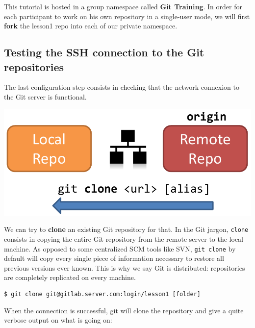 \documentclass{../common/tufte-latex/tufte-handout}
\begin{document}
This tutorial is hosted in a group namespace called \textbf{Git Training}.
In order for each participant to work on his own repository in a single-user mode, we will first \textbf{fork} the lesson1 repo into each of our private namespace.

\subsection{Testing the SSH connection to the Git repositories}

The last configuration step consists in checking  that the network connexion to the Git server is functional.
\begin{marginfigure}%
  \centering
  \includegraphics[width=\linewidth]{gitclone-schema.pdf}
  \label{fig:gitclone}
\end{marginfigure}
We can try to \textbf{clone} an existing Git repository for that.
In the Git jargon, \texttt{clone} consists in copying the entire Git repository from the remote server to the local machine.
As opposed to some centralized SCM tools like SVN, \texttt{git clone} by default will copy every single piece of information necessary to restore all previous versions ever known.
This is why we say Git is distributed: repositories are completely replicated on every machine.

\begin{lstlisting}[style=BashInputStyle]
  $ git clone git@gitlab.server.com:login/lesson1 [folder]
\end{lstlisting}

\noindent When the connection is successful, git will clone the repository and give a quite verbose output on what is going on:
\end{document}
